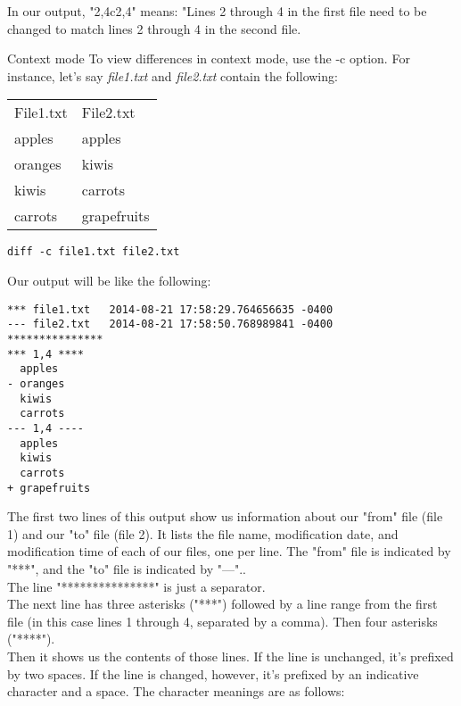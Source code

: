 \documentclass[hidelinks,12pt,a4paper,numbers=enddot]{scrartcl}
\begin{document}
In our output, "2,4c2,4" means: "Lines 2 through 4 in the first
file need to be changed to match lines 2 through 4 in the second file.

Context mode
To view differences in context mode, use the -c option.
For instance, let's say \emph{file1.txt} and \emph{file2.txt} contain
the following:\\

\begin{table}[h]
\begin{tabular}{ll}
    File1.txt &File2.txt \\
    apples &apples \\
    oranges &kiwis \\
    kiwis &carrots \\
    carrots &grapefruits \\
\end{tabular}
\end{table}

\begin{verbatim}
diff -c file1.txt file2.txt
\end{verbatim}

Our output will be like the following:

\begin{verbatim}
*** file1.txt   2014-08-21 17:58:29.764656635 -0400
--- file2.txt   2014-08-21 17:58:50.768989841 -0400
***************
*** 1,4 ****
  apples
- oranges
  kiwis
  carrots
--- 1,4 ----
  apples
  kiwis
  carrots
+ grapefruits
\end{verbatim}

The first two lines of this output show us information about our "from"
file (file 1) and our "to" file (file 2). It lists the file name,
modification date, and modification time of each of our files, one per
line. The "from" file is indicated by "***", and the "to" file is
indicated by "---"..\\

The line "***************" is just a separator.\\
The next line has three asterisks ("***") followed by a line
range from the first file (in this case lines 1 through 4, separated by
a comma). Then four asterisks ("****").\\
Then it shows us the contents of those lines. If the line is unchanged,
it's prefixed by two spaces. If the line is changed, however, it's prefixed
by an indicative character and a space. The character meanings are as
follows:
\end{document}
